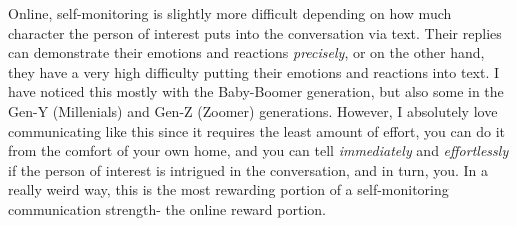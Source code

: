 \documentclass[12pt]{article}
\begin{document}
Online, self-monitoring is slightly more difficult depending on how much character the person of interest puts into the conversation via text. Their replies can demonstrate their emotions and reactions \emph{precisely}, or on the other hand, they have a very high difficulty putting their emotions and reactions into text. I have noticed this mostly with the Baby-Boomer generation, but also some in the Gen-Y (Millenials) and Gen-Z (Zoomer) generations. However, I absolutely love communicating like this since it requires the least amount of effort, you can do it from the comfort of your own home, and you can tell \emph{immediately} and \emph{effortlessly} if the person of interest is intrigued in the conversation, and in turn, you. In a really weird way, this is the most rewarding portion of a self-monitoring communication strength- the online reward portion.
\end{document}
